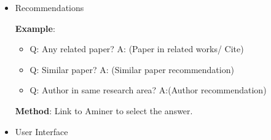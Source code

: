 \begin{itemize}
\begin{itemize}
\begin{itemize}
  \item2, We can search the key word on Wiki and return the answer if the question word is a general word.
  \end{itemize}
  
\item Recommendations

  \textbf{Example}:
  \begin{itemize}
  \item Q: Any related paper? A: (Paper in related works/ Cite)
  \item Q: Similar paper? A: (Similar paper recommendation)
  \item Q: Author in same research area? A:(Author recommendation)
  
  \end{itemize}

  \textbf{Method}: Link to Aminer to select the answer.
\item User Interface
\end{itemize}
\end{itemize}

